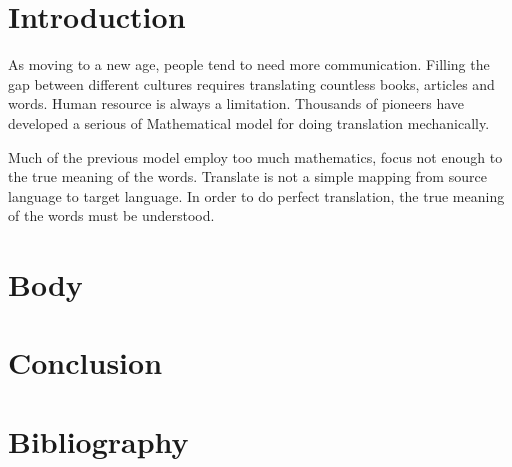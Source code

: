 \section{Introduction}

As moving to a new age, people tend to need more communication. Filling the gap between different cultures requires translating countless books, articles and words. Human resource is always a limitation. Thousands of 
pioneers have developed a serious of Mathematical model for doing translation mechanically. 

Much of the previous model employ too much mathematics, focus not enough to the true meaning of the words.
Translate is not a simple mapping from source language to target language. In order to do perfect translation,
the true meaning of the words must be understood. 

\cite{Compilers_Principles_Techniques_and_Tools}

\section{Body}
\section{Conclusion}
\section{Bibliography}



